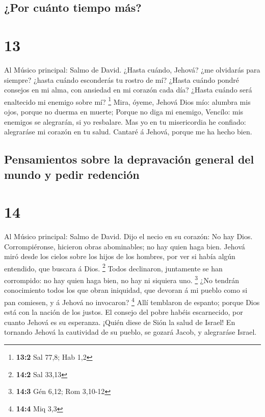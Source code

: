 \hypertarget{por-cuuxe1nto-tiempo-muxe1s}{%
\subsection{¿Por cuánto tiempo más?}\label{por-cuuxe1nto-tiempo-muxe1s}}

\hypertarget{section-12}{%
\section{13}\label{section-12}}

 Al Músico principal: Salmo de David. ¿Hasta cuándo, Jehová?
¿me olvidarás para siempre? ¿hasta cuándo esconderás tu rostro de mí?
 ¿Hasta cuándo pondré consejos en mi alma, con ansiedad en
mi corazón cada día? ¿Hasta cuándo será enaltecido mi enemigo sobre mí?
\footnote{\textbf{13:2} Sal 77,8; Hab 1,2}  Mira, óyeme,
Jehová Dios mío: alumbra mis ojos, porque no duerma en muerte;
 Porque no diga mi enemigo, Vencílo: mis enemigos se
alegrarán, si yo resbalare.  Mas yo en tu misericordia he
confiado: alegraráse mi corazón en tu salud.  Cantaré á
Jehová, porque me ha hecho bien.

\hypertarget{pensamientos-sobre-la-depravaciuxf3n-general-del-mundo-y-pedir-redenciuxf3n}{%
\subsection{Pensamientos sobre la depravación general del mundo y pedir
redención}\label{pensamientos-sobre-la-depravaciuxf3n-general-del-mundo-y-pedir-redenciuxf3n}}

\hypertarget{section-13}{%
\section{14}\label{section-13}}

 Al Músico principal: Salmo de David. Dijo el necio en su
corazón: No hay Dios. Corrompiéronse, hicieron obras abominables; no hay
quien haga bien.  Jehová miró desde los cielos sobre los
hijos de los hombres, por ver si había algún entendido, que buscara á
Dios. \footnote{\textbf{14:2} Sal 33,13}  Todos declinaron,
juntamente se han corrompido: no hay quien haga bien, no hay ni siquiera
uno. \footnote{\textbf{14:3} Gén 6,12; Rom 3,10-12}  ¿No
tendrán conocimiento todos los que obran iniquidad, que devoran á mi
pueblo como si pan comiesen, y á Jehová no invocaron? \footnote{\textbf{14:4}
  Miq 3,3}  Allí temblaron de espanto; porque Dios está con
la nación de los justos.  El consejo del pobre habéis
escarnecido, por cuanto Jehová es su esperanza.  ¡Quién
diese de Sión la salud de Israel! En tornando Jehová la cautividad de su
pueblo, se gozará Jacob, y alegraráse Israel.

